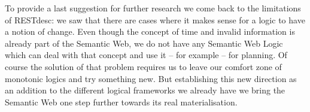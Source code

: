 % 

% 

% 

To provide a last suggestion for further research we come back to the limitations of RESTdesc: we saw that there are cases where it makes sense for a logic to
have a notion of change. Even though the concept of time and invalid information is already part of the Semantic Web, we do not have any Semantic Web
Logic which can deal with that concept and use it -- for example -- for planning. Of course the solution of that problem requires us to leave our comfort zone of 
monotonic logics and try something new. But establishing this new direction as an addition to the different logical frameworks we already have we bring the Semantic 
Web one step further towards its real materialisation.

% 









